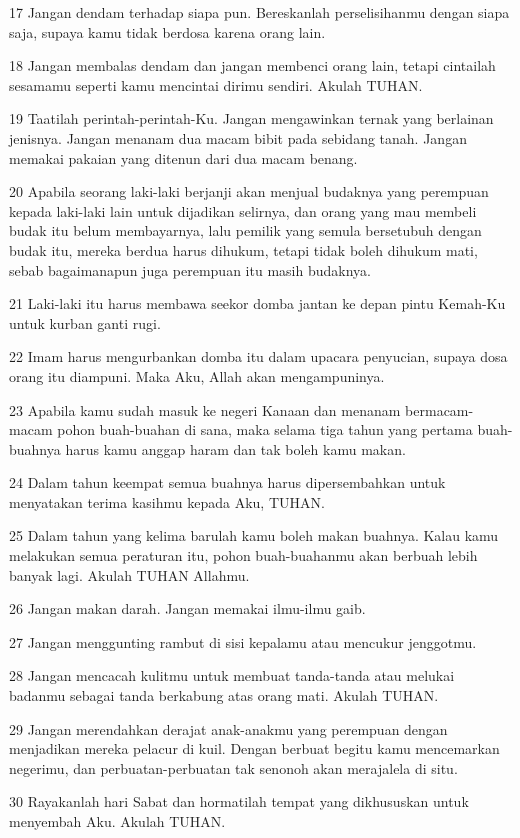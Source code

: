 \par 17 Jangan dendam terhadap siapa pun. Bereskanlah perselisihanmu dengan siapa saja, supaya kamu tidak berdosa karena orang lain.
\par 18 Jangan membalas dendam dan jangan membenci orang lain, tetapi cintailah sesamamu seperti kamu mencintai dirimu sendiri. Akulah TUHAN.
\par 19 Taatilah perintah-perintah-Ku. Jangan mengawinkan ternak yang berlainan jenisnya. Jangan menanam dua macam bibit pada sebidang tanah. Jangan memakai pakaian yang ditenun dari dua macam benang.
\par 20 Apabila seorang laki-laki berjanji akan menjual budaknya yang perempuan kepada laki-laki lain untuk dijadikan selirnya, dan orang yang mau membeli budak itu belum membayarnya, lalu pemilik yang semula bersetubuh dengan budak itu, mereka berdua harus dihukum, tetapi tidak boleh dihukum mati, sebab bagaimanapun juga perempuan itu masih budaknya.
\par 21 Laki-laki itu harus membawa seekor domba jantan ke depan pintu Kemah-Ku untuk kurban ganti rugi.
\par 22 Imam harus mengurbankan domba itu dalam upacara penyucian, supaya dosa orang itu diampuni. Maka Aku, Allah akan mengampuninya.
\par 23 Apabila kamu sudah masuk ke negeri Kanaan dan menanam bermacam-macam pohon buah-buahan di sana, maka selama tiga tahun yang pertama buah-buahnya harus kamu anggap haram dan tak boleh kamu makan.
\par 24 Dalam tahun keempat semua buahnya harus dipersembahkan untuk menyatakan terima kasihmu kepada Aku, TUHAN.
\par 25 Dalam tahun yang kelima barulah kamu boleh makan buahnya. Kalau kamu melakukan semua peraturan itu, pohon buah-buahanmu akan berbuah lebih banyak lagi. Akulah TUHAN Allahmu.
\par 26 Jangan makan darah. Jangan memakai ilmu-ilmu gaib.
\par 27 Jangan menggunting rambut di sisi kepalamu atau mencukur jenggotmu.
\par 28 Jangan mencacah kulitmu untuk membuat tanda-tanda atau melukai badanmu sebagai tanda berkabung atas orang mati. Akulah TUHAN.
\par 29 Jangan merendahkan derajat anak-anakmu yang perempuan dengan menjadikan mereka pelacur di kuil. Dengan berbuat begitu kamu mencemarkan negerimu, dan perbuatan-perbuatan tak senonoh akan merajalela di situ.
\par 30 Rayakanlah hari Sabat dan hormatilah tempat yang dikhususkan untuk menyembah Aku. Akulah TUHAN.
